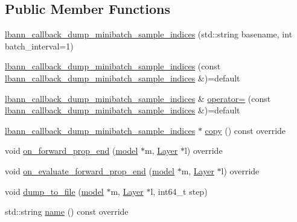 \subsection*{Public Member Functions}
\begin{DoxyCompactItemize}
\item 
\hyperlink{classlbann_1_1lbann__callback__dump__minibatch__sample__indices_a32e575722f9ad6f5a48a3fad20282075}{lbann\+\_\+callback\+\_\+dump\+\_\+minibatch\+\_\+sample\+\_\+indices} (std\+::string basename, int batch\+\_\+interval=1)
\item 
\hyperlink{classlbann_1_1lbann__callback__dump__minibatch__sample__indices_a11251f7788b1f167143e98647c93d80c}{lbann\+\_\+callback\+\_\+dump\+\_\+minibatch\+\_\+sample\+\_\+indices} (const \hyperlink{classlbann_1_1lbann__callback__dump__minibatch__sample__indices}{lbann\+\_\+callback\+\_\+dump\+\_\+minibatch\+\_\+sample\+\_\+indices} \&)=default
\item 
\hyperlink{classlbann_1_1lbann__callback__dump__minibatch__sample__indices}{lbann\+\_\+callback\+\_\+dump\+\_\+minibatch\+\_\+sample\+\_\+indices} \& \hyperlink{classlbann_1_1lbann__callback__dump__minibatch__sample__indices_aa1db9d6cef232a868110d72e4bc2477a}{operator=} (const \hyperlink{classlbann_1_1lbann__callback__dump__minibatch__sample__indices}{lbann\+\_\+callback\+\_\+dump\+\_\+minibatch\+\_\+sample\+\_\+indices} \&)=default
\item 
\hyperlink{classlbann_1_1lbann__callback__dump__minibatch__sample__indices}{lbann\+\_\+callback\+\_\+dump\+\_\+minibatch\+\_\+sample\+\_\+indices} $\ast$ \hyperlink{classlbann_1_1lbann__callback__dump__minibatch__sample__indices_a6847ea742037dbe5f4ee6d2b4b4307a4}{copy} () const override
\item 
void \hyperlink{classlbann_1_1lbann__callback__dump__minibatch__sample__indices_ac1a1359c0016eb0bcbdb767fc57e9154}{on\+\_\+forward\+\_\+prop\+\_\+end} (\hyperlink{classlbann_1_1model}{model} $\ast$m, \hyperlink{classlbann_1_1Layer}{Layer} $\ast$l) override
\item 
void \hyperlink{classlbann_1_1lbann__callback__dump__minibatch__sample__indices_acb641b979a37cc703994103a4e8428a5}{on\+\_\+evaluate\+\_\+forward\+\_\+prop\+\_\+end} (\hyperlink{classlbann_1_1model}{model} $\ast$m, \hyperlink{classlbann_1_1Layer}{Layer} $\ast$l) override
\item 
void \hyperlink{classlbann_1_1lbann__callback__dump__minibatch__sample__indices_a34d4564309168b3ab0b2e3092e2f9355}{dump\+\_\+to\+\_\+file} (\hyperlink{classlbann_1_1model}{model} $\ast$m, \hyperlink{classlbann_1_1Layer}{Layer} $\ast$l, int64\+\_\+t step)
\item 
std\+::string \hyperlink{classlbann_1_1lbann__callback__dump__minibatch__sample__indices_a8d2174d894176a7ab5324f5d7e6faad2}{name} () const override
\end{DoxyCompactItemize}
